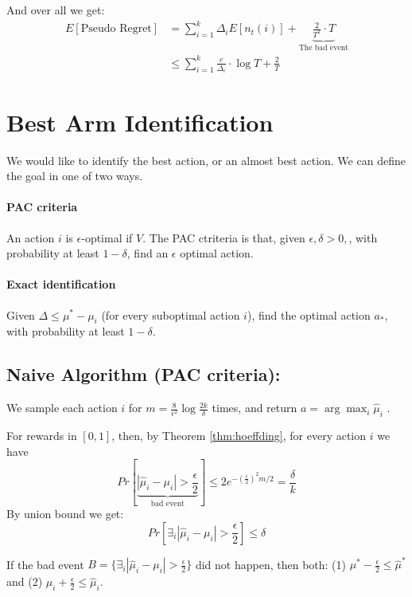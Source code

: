 And over all we get:
\begin{align*}
E\left[\text{Pseudo Regret}\right] & =
\sum_{i=1}^{k}\Delta_{i}E\left[n_{t}(i)\right]+\underbrace{\frac{2}{T^{2}}\cdot
T}_{\text{The bad event}}
\\
 & \le  \sum_{i=1}^{k}\frac{c}{\Delta_{i}}\cdot\log T+\frac{2}{T}
\end{align*}

\section{Best Arm Identification}

We would like to identify the best action, or an almost best action.
We can define the goal in one of two ways.

\paragraph{PAC criteria }
An action $i$ is $\epsilon$-optimal if  $V$. The PAC ctriteria is
that, given $\epsilon,\delta>0,$, with probability at least
$1-\delta$, find an $\epsilon$ optimal action.

\paragraph{Exact identification}
Given $\Delta\le\mu^{*}-\mu_{i}$ (for every suboptimal action $i$),
find the optimal action $a_{*}$, with probability at least
$1-\delta$.

\subsection{Naive Algorithm (PAC criteria):}

We sample each action $i$ for
$m=\frac{8}{\epsilon^{2}}\log\frac{2k}{\delta}$ times, and return
$a= \arg\max_{i}\hat{\mu}_{i}$ .

For rewards in $[ 0 ,1]$, then, by Theorem \ref{thm:hoeffding}, for
every action $i$ we have
\[
Pr\left[\underbrace{\left|\hat{\mu}_{i}-\mu_{i}\right|>\frac{\epsilon}{2}}_{\text{bad
event}}\right]\le 2
e^{-\left(\frac{\epsilon}{2}\right)^{2}m/2}=\frac{\delta}{k}
\]
By union bound we get:
\[
Pr\left[\exists_{i}\left|\hat{\mu}_{i}-\mu_{i}\right|>\frac{\epsilon}{2}\right]\le\delta
\]

If the bad event
$B=\{\exists_{i}\left|\hat{\mu}_{i}-\mu_{i}\right|>\frac{\epsilon}{2}\}$
did not happen, then both: (1)
$\mu^{*}-\frac{\epsilon}{2}\le\hat{\mu}^{*}$ and (2)
$\mu_{i}+\frac{\epsilon}{2}\le\hat{\mu}_{i}$.


